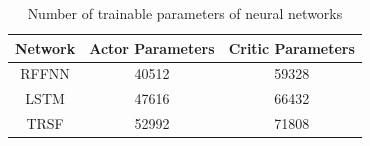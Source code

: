 \begin{table}
	\begin{center}
		\caption{Number of trainable parameters of neural networks}
		\begin{tabular}{||c c c||} 
			\hline
			Network & Actor Parameters & Critic Parameters \\ [0.5ex] 
			\hline\hline
			RFFNN & 40512 & 59328 \\ 
			\hline
			LSTM & 47616 & 66432 \\
			\hline
			TRSF & 52992 & 71808 \\
			\hline
		\end{tabular}
		\label{table:net_parameters}
	\end{center}
\end{table}

